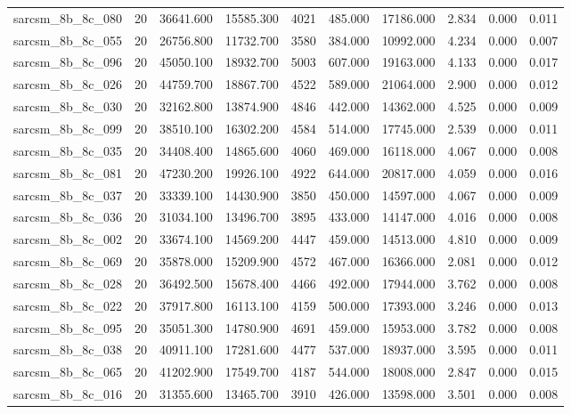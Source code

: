 \begin{tabular}{lrrrrrrrrr}
sarcsm\_8b\_8c\_080 & 20 & 36641.600 & 15585.300 & 4021 & 485.000 & 17186.000 & 2.834 & 0.000 & 0.011 \\
sarcsm\_8b\_8c\_055 & 20 & 26756.800 & 11732.700 & 3580 & 384.000 & 10992.000 & 4.234 & 0.000 & 0.007 \\
sarcsm\_8b\_8c\_096 & 20 & 45050.100 & 18932.700 & 5003 & 607.000 & 19163.000 & 4.133 & 0.000 & 0.017 \\
sarcsm\_8b\_8c\_026 & 20 & 44759.700 & 18867.700 & 4522 & 589.000 & 21064.000 & 2.900 & 0.000 & 0.012 \\
sarcsm\_8b\_8c\_030 & 20 & 32162.800 & 13874.900 & 4846 & 442.000 & 14362.000 & 4.525 & 0.000 & 0.009 \\
sarcsm\_8b\_8c\_099 & 20 & 38510.100 & 16302.200 & 4584 & 514.000 & 17745.000 & 2.539 & 0.000 & 0.011 \\
sarcsm\_8b\_8c\_035 & 20 & 34408.400 & 14865.600 & 4060 & 469.000 & 16118.000 & 4.067 & 0.000 & 0.008 \\
sarcsm\_8b\_8c\_081 & 20 & 47230.200 & 19926.100 & 4922 & 644.000 & 20817.000 & 4.059 & 0.000 & 0.016 \\
sarcsm\_8b\_8c\_037 & 20 & 33339.100 & 14430.900 & 3850 & 450.000 & 14597.000 & 4.067 & 0.000 & 0.009 \\
sarcsm\_8b\_8c\_036 & 20 & 31034.100 & 13496.700 & 3895 & 433.000 & 14147.000 & 4.016 & 0.000 & 0.008 \\
sarcsm\_8b\_8c\_002 & 20 & 33674.100 & 14569.200 & 4447 & 459.000 & 14513.000 & 4.810 & 0.000 & 0.009 \\
sarcsm\_8b\_8c\_069 & 20 & 35878.000 & 15209.900 & 4572 & 467.000 & 16366.000 & 2.081 & 0.000 & 0.012 \\
sarcsm\_8b\_8c\_028 & 20 & 36492.500 & 15678.400 & 4466 & 492.000 & 17944.000 & 3.762 & 0.000 & 0.008 \\
sarcsm\_8b\_8c\_022 & 20 & 37917.800 & 16113.100 & 4159 & 500.000 & 17393.000 & 3.246 & 0.000 & 0.013 \\
sarcsm\_8b\_8c\_095 & 20 & 35051.300 & 14780.900 & 4691 & 459.000 & 15953.000 & 3.782 & 0.000 & 0.008 \\
sarcsm\_8b\_8c\_038 & 20 & 40911.100 & 17281.600 & 4477 & 537.000 & 18937.000 & 3.595 & 0.000 & 0.011 \\
sarcsm\_8b\_8c\_065 & 20 & 41202.900 & 17549.700 & 4187 & 544.000 & 18008.000 & 2.847 & 0.000 & 0.015 \\
sarcsm\_8b\_8c\_016 & 20 & 31355.600 & 13465.700 & 3910 & 426.000 & 13598.000 & 3.501 & 0.000 & 0.008 \\

\end{tabular}
